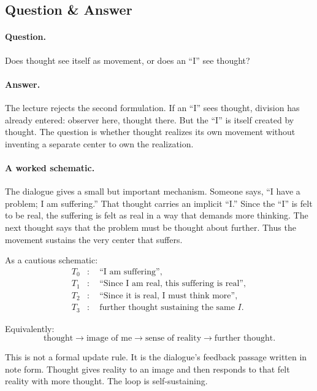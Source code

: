 \subsection{Question \& Answer}

\paragraph{Question.}
Does thought see itself as movement, or does an ``I'' see thought?

\paragraph{Answer.}
The lecture rejects the second formulation. If an ``I'' sees thought, division has already entered: observer here, thought there. But the ``I'' is itself created by thought. The question is whether thought realizes its own movement without inventing a separate center to own the realization.

\paragraph{A worked schematic.}
The dialogue gives a small but important mechanism. Someone says, ``I have a problem; I am suffering.'' That thought carries an implicit ``I.'' Since the ``I'' is felt to be real, the suffering is felt as real in a way that demands more thinking. The next thought says that the problem must be thought about further. Thus the movement sustains the very center that suffers.

As a cautious schematic:
\begin{align}
T_0 &: \quad \text{``I am suffering''}, \\
T_1 &: \quad \text{``Since I am real, this suffering is real''}, \\
T_2 &: \quad \text{``Since it is real, I must think more''}, \\
T_3 &: \quad \text{further thought sustaining the same } I.
\end{align}

Equivalently:
\begin{equation}
\text{thought}
\longrightarrow
\text{image of me}
\longrightarrow
\text{sense of reality}
\longrightarrow
\text{further thought}.
\end{equation}

This is not a formal update rule. It is the dialogue's feedback passage written in note form. Thought gives reality to an image and then responds to that felt reality with more thought. The loop is self-sustaining.

